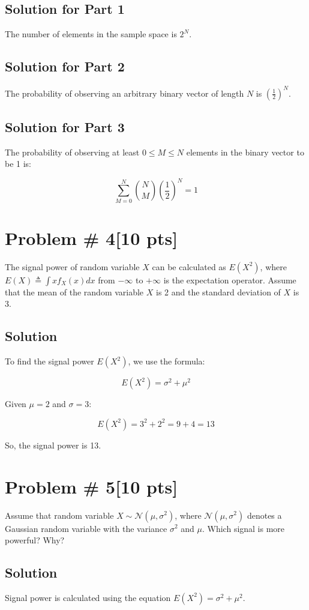 \documentclass{article}
\begin{document}
\subsection*{Solution for Part 1}
The number of elements in the sample space is \(2^N\).

\subsection*{Solution for Part 2}
The probability of observing an arbitrary binary vector of length \(N\) is \(\left(\frac{1}{2}\right)^N\).

\subsection*{Solution for Part 3}
The probability of observing at least \(0 \leq M \leq N\) elements in the binary vector to be 1 is:

\[
\sum_{M=0}^{N} \binom{N}{M} \left(\frac{1}{2}\right)^N = 1
\]
\newpage
\section*{Problem \# 4[10 pts]}
The signal power of random variable \(X\) can be calculated as \(E(X^2)\), where \(E(X) \triangleq \int x f_X(x) dx\) from \(-\infty\) to \(+\infty\) is the expectation operator. Assume that the mean of the random variable \(X\) is 2 and the standard deviation of \(X\) is 3.

\subsection*{Solution}
To find the signal power \(E(X^2)\), we use the formula:

\[
E(X^2) = \sigma^2 + \mu^2
\]

Given \( \mu = 2 \) and \( \sigma = 3 \):

\[
E(X^2) = 3^2 + 2^2 = 9 + 4 = 13
\]

So, the signal power is 13.
\newpage
\section*{Problem \# 5[10 pts]}
Assume that random variable \(X \sim \mathcal{N}(\mu, \sigma^2)\), where \(\mathcal{N}(\mu, \sigma^2)\) denotes a Gaussian random variable with the variance \(\sigma^2\) and \(\mu\). Which signal is more powerful? Why?

\subsection*{Solution}
Signal power is calculated using the equation \(E(X^2) = \sigma^2 + \mu^2\).
\end{document}
